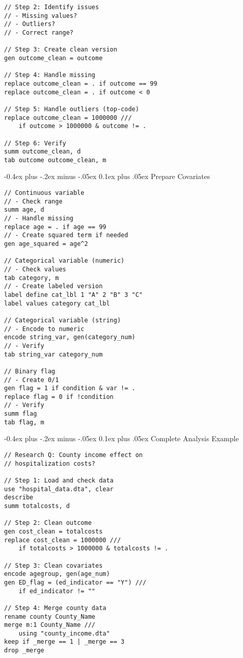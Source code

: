 \documentclass[8pt,letterpaper]{article}
\makeatletter
\renewcommand{\subsection}{\@startsection{subsection}{2}{0mm}%
                                {-0.4ex plus -.2ex minus -.05ex}%
                                {0.1ex plus .05ex}%
                                {\normalfont\fontsize{7.5pt}{7.5pt}\selectfont\bfseries\color{myblue}}}
\makeatother
\begin{document}
\begin{multicols}{2}
\begin{lstlisting}
// Step 2: Identify issues
// - Missing values?
// - Outliers?
// - Correct range?

// Step 3: Create clean version
gen outcome_clean = outcome

// Step 4: Handle missing
replace outcome_clean = . if outcome == 99
replace outcome_clean = . if outcome < 0

// Step 5: Handle outliers (top-code)
replace outcome_clean = 1000000 ///
    if outcome > 1000000 & outcome != .

// Step 6: Verify
summ outcome_clean, d
tab outcome outcome_clean, m
\end{lstlisting}

\subsection{Prepare Covariates}
\begin{lstlisting}
// Continuous variable
// - Check range
summ age, d
// - Handle missing
replace age = . if age == 99
// - Create squared term if needed
gen age_squared = age^2

// Categorical variable (numeric)
// - Check values
tab category, m
// - Create labeled version
label define cat_lbl 1 "A" 2 "B" 3 "C"
label values category cat_lbl

// Categorical variable (string)
// - Encode to numeric
encode string_var, gen(category_num)
// - Verify
tab string_var category_num

// Binary flag
// - Create 0/1
gen flag = 1 if condition & var != .
replace flag = 0 if !condition
// - Verify
summ flag
tab flag, m
\end{lstlisting}

\subsection{Complete Analysis Example}
\begin{lstlisting}
// Research Q: County income effect on
// hospitalization costs?

// Step 1: Load and check data
use "hospital_data.dta", clear
describe
summ totalcosts, d

// Step 2: Clean outcome
gen cost_clean = totalcosts
replace cost_clean = 1000000 ///
    if totalcosts > 1000000 & totalcosts != .

// Step 3: Clean covariates
encode agegroup, gen(age_num)
gen ED_flag = (ed_indicator == "Y") ///
    if ed_indicator != ""

// Step 4: Merge county data
rename county County_Name
merge m:1 County_Name ///
    using "county_income.dta"
keep if _merge == 1 | _merge == 3
drop _merge


\end{lstlisting}
\end{multicols}
\end{document}
